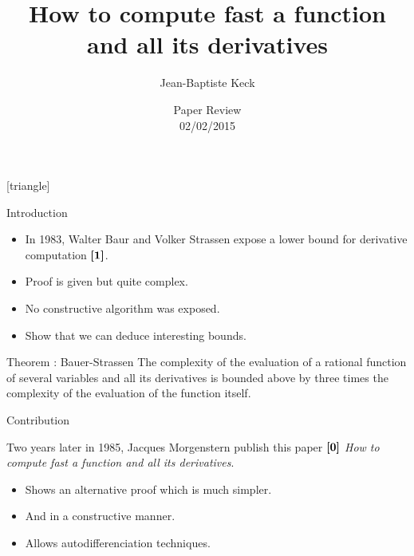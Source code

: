 



[triangle]
{}



\title{\Large How to compute fast a function and all its derivatives}
\author[Keck]{\Large Jean-Baptiste Keck}
\date{\large Paper Review\\ 02/02/2015}

\begin{frame}
    \titlepage
\end{frame}

\begin{frame}{Introduction}

    \begin{itemize} 
        \item In 1983, Walter Baur and Volker Strassen expose a lower bound for derivative computation $\ccite{1}$.
        \item Proof is given but quite complex.
        \item No constructive algorithm was exposed.
        \item Show that we can deduce interesting bounds.
    \end{itemize}

    \begin{block}{Theorem : Bauer-Strassen}
        The complexity of the evaluation of a rational function of several variables and all its derivatives is bounded above by three times the complexity of the evaluation of the function itself.
    \end{block}
\end{frame}

\begin{frame}{Contribution}
       
    Two years later in 1985, Jacques Morgenstern publish this paper $\ccite{0}$ \textit{How to compute fast a function and all its derivatives}.

    \vskip 0.5cm

    \begin{itemize} 
        \item Shows an alternative proof which is much simpler.
        \item And in a \alert{constructive} manner.
        \item Allows \alert{autodifferenciation} techniques.
    \end{itemize}
\end{frame}

